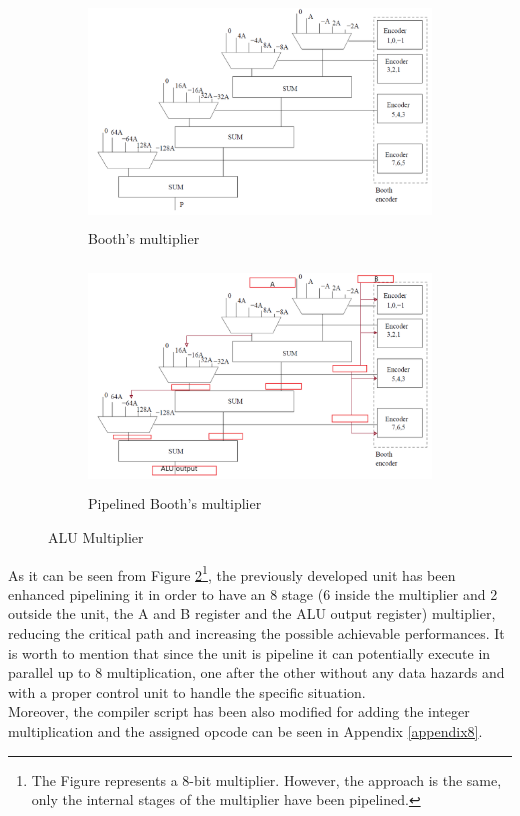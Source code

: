\begin{figure}[!htbp]
\begin{subfigure}{.5\textwidth}
\centering
\includegraphics[scale=0.7,width=1\linewidth,height=6cm]{./chapters/figures/mult.PNG}
\caption{Booth's multiplier}
\label{fig:alumula}
\end{subfigure}
\begin{subfigure}{.5\textwidth}
\centering
\includegraphics[scale=0.7,width=1\linewidth,height=6cm]{./chapters/figures/mult_pip.PNG}
\caption{Pipelined Booth's multiplier\protect\footnotemark[2]}
\label{fig:alumulb}
\end{subfigure}
\caption{ALU Multiplier}
\label{fig:alumul}
\end{figure}
As it can be seen from Figure \ref{fig:alumulb}\footnote[3]{The Figure represents a 8-bit multiplier. However, the approach is the same, only the internal stages of the multiplier have been pipelined.}, the previously developed unit has been enhanced pipelining it in order to have an 8 stage (6 inside the multiplier and 2 outside the unit, the A and B register and the ALU output register) multiplier, reducing the critical path and increasing the possible achievable performances. It is worth to mention that since the unit is pipeline it can potentially execute in parallel up to 8 multiplication, one after the other without any data hazards and with a proper control unit to handle the specific situation.\\
Moreover, the compiler script has been also modified for adding the integer multiplication and the assigned opcode can be seen in Appendix \ref{appendix8}.